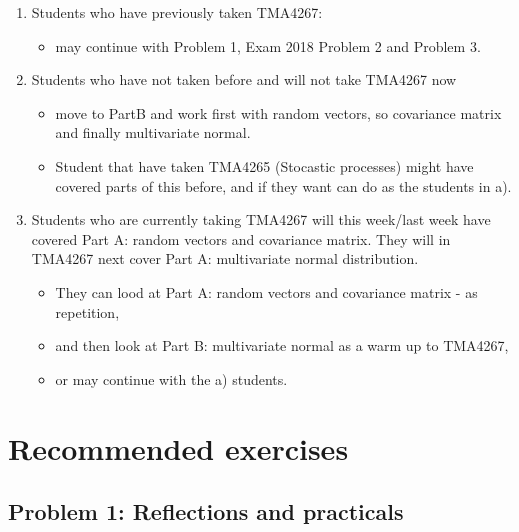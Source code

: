 \documentclass[]{article}
\providecommand{\tightlist}{%
  \setlength{\itemsep}{0pt}\setlength{\parskip}{0pt}}
\begin{document}
\begin{enumerate}
\def\labelenumi{\alph{enumi})}
\tightlist
\item
  Students who have previously taken TMA4267:

  \begin{itemize}
  \tightlist
  \item
    may continue with Problem 1, Exam 2018 Problem 2 and Problem 3.
  \end{itemize}
\item
  Students who have not taken before and will not take TMA4267 now

  \begin{itemize}
  \tightlist
  \item
    move to PartB and work first with random vectors, so covariance
    matrix and finally multivariate normal.
  \item
    Student that have taken TMA4265 (Stocastic processes) might have
    covered parts of this before, and if they want can do as the
    students in a).
  \end{itemize}
\item
  Students who are currently taking TMA4267 will this week/last week
  have covered Part A: random vectors and covariance matrix. They will
  in TMA4267 next cover Part A: multivariate normal distribution.

  \begin{itemize}
  \tightlist
  \item
    They can lood at Part A: random vectors and covariance matrix - as
    repetition,
  \item
    and then look at Part B: multivariate normal as a warm up to
    TMA4267,
  \item
    or may continue with the a) students.
  \end{itemize}
\end{enumerate}

\hypertarget{recommended-exercises}{%
\section{Recommended exercises}\label{recommended-exercises}}

\hypertarget{problem-1-reflections-and-practicals}{%
\subsection{Problem 1: Reflections and
practicals}\label{problem-1-reflections-and-practicals}}
\end{document}
